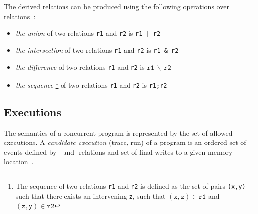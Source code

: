 The derived relations can be produced using the following operations over relations~\cite{alglave2016syntax}: %

\begin{itemize}
	\item \textit{the union} of two relations \texttt{r1} and \texttt{r2} is \texttt{r1\,|\,r2}
	\item \textit{the intersection} of two relations \texttt{r1} and \texttt{r2} is \texttt{r1\,\&\,r2}
	\item \textit{the difference} of two relations \texttt{r1} and \texttt{r2} is $\mathtt{r1\,\backslash\,r2}$
	\item \textit{the sequence}
\footnote{The sequence of two relations \texttt{r1} and \texttt{r2} is defined as the set of pairs \texttt{(x,y)} such that there exists an intervening \texttt{z}, such that $\mathtt{(x,z)} \in \mathtt{r1}$ and $\mathtt{(z,y)} \in \mathtt{r2}$}
	of two relations \texttt{r1} and \texttt{r2} is \texttt{r1;r2}
\end{itemize}




\subsection{Executions}
\label{ch:wmm:model:executions}

The semantics of a concurrent program is represented by the set of allowed executions.
A \textit{candidate execution} (trace, run) of a program is an ordered set of events defined by \po- and \rf-relations and set of final writes to a given memory location~\cite{alglave2014herding}.

